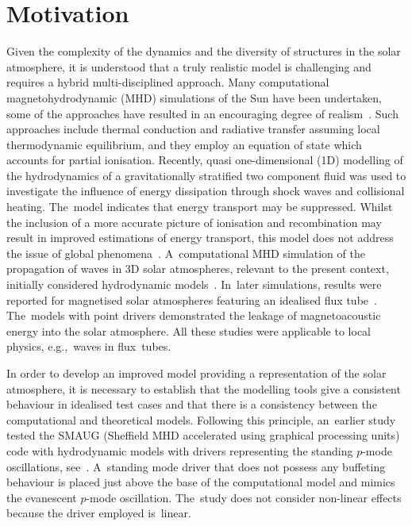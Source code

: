 \documentclass[physics,article,accept,pdftex,moreauthors]{Definitions/mdpi}
\begin{document}
\section{Motivation}\label{sec2}
\label{sec:motivation}

Given the complexity of the dynamics and the diversity of structures in the solar atmosphere, it is understood that a truly realistic model is challenging and  requires a hybrid multi-disciplined approach. Many computational 
 {magnetohydrodynamic (MHD)}  
simulations of the Sun have been undertaken, some of the approaches have resulted in an encouraging degree of realism~\cite{Vogler2005,Gudiksen2011}. Such approaches include thermal conduction and radiative transfer assuming local thermodynamic equilibrium, and they employ an equation of state which accounts for partial ionisation.  Recently, quasi 
 {one-dimensional
(1D)}  
modelling of the hydrodynamics of a gravitationally stratified two component fluid was used to investigate the influence of energy dissipation through shock waves and collisional heating. The~model indicates that energy transport may be suppressed. Whilst the inclusion of a more accurate picture of ionisation and recombination may result in improved estimations of energy transport, this model does not address the issue of global phenomena~\cite{Zhang2021}. A~computational MHD simulation of the propagation of waves in 3D solar atmospheres, relevant to the present context, initially considered hydrodynamic models~\cite{Fedun2009a}.  In~later simulations, results were reported for magnetised solar atmospheres featuring an idealised flux tube~\cite{Fedun2009b,Vigeesh2012}. The~models with point drivers demonstrated the leakage of magnetoacoustic energy into the solar atmosphere. All these studies were applicable to local physics, e.g.,~waves in flux~tubes.   

In order to develop an improved model providing a representation of the solar atmosphere, it is necessary to establish that the modelling tools give a consistent behaviour in idealised test cases and that there is a consistency between the computational and theoretical models.  Following this principle, an~earlier 
 {study}  
tested the SMAUG {(Sheffield MHD accelerated using graphical processing units)} %
code with hydrodynamic models with drivers representing the standing $p$-mode oscillations, see~\cite{Griffiths2018b}. A~standing mode driver that does not possess any buffeting behaviour is placed just above the base of the computational model and mimics the evanescent $p$-mode oscillation. The~study does not consider non-linear effects because the driver employed is~linear.
\end{document}
